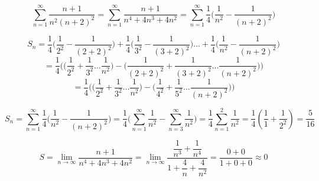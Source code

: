 {}

$$
  \sum_{n=1}^\infty \dfrac{n+1}{n^2(n+2)^2}
= \sum_{n=1}^\infty \dfrac{n+1}{n^4+4n^3+4n^2}
= \sum_{n=1}^\infty \dfrac{1}{4}\Big( \dfrac{1}{n^2} - \dfrac{1}{(n+2)^2} \Big)
$$



$$
S_n = \dfrac{1}{4}\Big( \dfrac{1}{2^2} - \dfrac{1}{(2+2)^2} \Big) + \dfrac{1}{4}\Big( \dfrac{1}{3^2} - \dfrac{1}{(3+2)^2} \Big) \ldots + \dfrac{1}{4}\Big( \dfrac{1}{n^2} - \dfrac{1}{(n+2)^2} \Big)
$$
$$
= \dfrac{1}{4} \Bigg(
  \Big( \dfrac{1}{2^2} + \dfrac{1}{3^2} \ldots \dfrac{1}{n^2} \Big) -
  \Big( \dfrac{1}{(2+2)^2} + \dfrac{1}{(3+2)^2} \ldots \dfrac{1}{(n+2)^2} \Big)
  \Bigg)
$$
$$
= \dfrac{1}{4} \Bigg(
  \Big( \dfrac{1}{2^2} + \dfrac{1}{3^2} \ldots \dfrac{1}{n^2} \Big) -
  \Big( \dfrac{1}{4^2} + \dfrac{1}{5^2} \ldots \dfrac{1}{(n+2)^2} \Big)
  \Bigg)
$$



$$
S_n = \sum_{n=1}^\infty \dfrac{1}{4}\Big( \dfrac{1}{n^2} - \dfrac{1}{(n+2)^2} \Big)
= \dfrac{1}{4} \Big( \sum_{n=1}^\infty  \dfrac{1}{n^2} - \sum_{n=3}^\infty \dfrac{1}{n^2}\Big)
= \dfrac{1}{4}  \sum_{n=1}^2  \dfrac{1}{n^2}
= \dfrac{1}{4} (\dfrac{1}{1}+\dfrac{1}{2^2}) = \boxed{\dfrac{5}{16}}
$$

$$
S
= \lim_{n \to \infty} \dfrac{n+1}{n^4+4n^3+4n^2}
= \lim_{n \to \infty}  \dfrac{\dfrac{1}{n^3}+\dfrac{1}{n^4}}{1+\dfrac{4}{n}+\dfrac{4}{n^2}  }
= \dfrac{0+0}{1+0+0  } \approx \boxed{0}
$$
